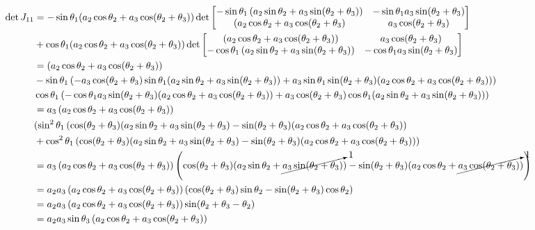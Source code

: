 \documentclass{article}
\begin{document}
\begin{align*}
\det J_{11}
	& = 
	-\sin \theta_1 (a_2 \cos \theta_2 + a_3 \cos ( \theta_2 + \theta_3))
	\det \left[ \begin{matrix}
			- \sin \theta_1 
				\left(a_2 \sin \theta_2 + a_3 \sin (\theta_2 + \theta_3)\right) 
			&
			- \sin \theta_1 a_3 \sin(\theta_2 + \theta_3)\\
			\left(a_2 \cos \theta_2 + a_3 \cos ( \theta_2 + \theta_3 \right)
			&
			a_3 \cos (\theta_2 + \theta_3)
	\end{matrix} \right]\\
	& + \cos \theta_1 (a_2 \cos \theta_2 + a_3 \cos ( \theta_2 + \theta_3))
	\det \left[ \begin{matrix}
		(a_2 \cos \theta_2 + a_3 \cos ( \theta_2 + \theta_3 ))
		&
		a_3 \cos (\theta_2 + \theta_3)\\
		- \cos \theta_1 
			\left(a_2 \sin \theta_2 + a_3 \sin (\theta_2 + \theta_3)\right)
			&
		- \cos \theta_1 a_3 \sin(\theta_2 + \theta_3)
	\end{matrix} \right]\\
	& = \left( a_2 \cos \theta_2 + a_3 \cos (\theta_2 + \theta_3) \right)\\
	&
		- \sin \theta_1
			\left( - a_3 \cos(\theta_2 + \theta_3)
					\sin \theta_1 (a_2 \sin \theta_2 + a_3 \sin (\theta_2 + \theta_3))
					+ a_3 \sin \theta_1 \sin(\theta_2 + \theta_3)
					(a_2 \cos \theta_2 + a_3 \cos (\theta_2 + \theta_3)) \right)\\
	&	\cos \theta_1
			\left( - \cos \theta_1 a_3 \sin(\theta_2 + \theta_3)
				(a_2 \cos \theta_2 + a_3 \cos(\theta_2 + \theta_3))
				+ a_3 \cos(\theta_2 + \theta_3)
				\cos \theta_1 (a_2 \sin \theta_2 + a_3 \sin(\theta_2 + \theta_3))
			\right)\\
	& = a_3 \left( a_2 \cos \theta_2 + a_3 \cos (\theta_2  +\theta_3) \right)\\
	& (\sin^2 \theta_1 
		\left(
			\cos(\theta_2 + \theta_3)(a_2 \sin \theta_2 + a_3 \sin (\theta_2 + \theta_3)
			- \sin(\theta_2 + \theta_3)(a_2 \cos \theta_2 + a_3 \cos (\theta_2 + \theta_3)
		\right)\\
	& + \cos^2 \theta_1 
		\left(
			\cos(\theta_2 + \theta_3)(a_2 \sin \theta_2 + a_3 \sin (\theta_2 + \theta_3)
			- \sin(\theta_2 + \theta_3)(a_2 \cos \theta_2 + a_3 \cos (\theta_2 + \theta_3)
		\right) )\\
	& = a_3 \left( a_2 \cos \theta_2 + a_3 \cos (\theta_2  +\theta_3) \right)
		\left(
			\cos(\theta_2 + \theta_3)(a_2 \sin \theta_2 + \cancelto1{a_3 \sin (\theta_2 + \theta_3)})
			- \sin(\theta_2 + \theta_3)(a_2 \cos \theta_2 + \cancelto1{a_3 \cos (\theta_2 + \theta_3)})
		\right)\\
	& = a_2 a_3 \left( a_2 \cos \theta_2 + a_3 \cos (\theta_2  +\theta_3) \right)
		\left(
			\cos(\theta_2 + \theta_3) \sin \theta_2
			- \sin(\theta_2 + \theta_3) \cos \theta_2
		\right)\\
	& = a_2 a_3 \left( a_2 \cos \theta_2 + a_3 \cos (\theta_2  +\theta_3) \right)
		\sin ( \theta_2 + \theta_3 - \theta_2 )\\
	& = a_2 a_3 \sin \theta_3 \left( a_2 \cos \theta_2 + a_3 \cos (\theta_2  +\theta_3) \right)
\end{align*}
		
\end{document}
